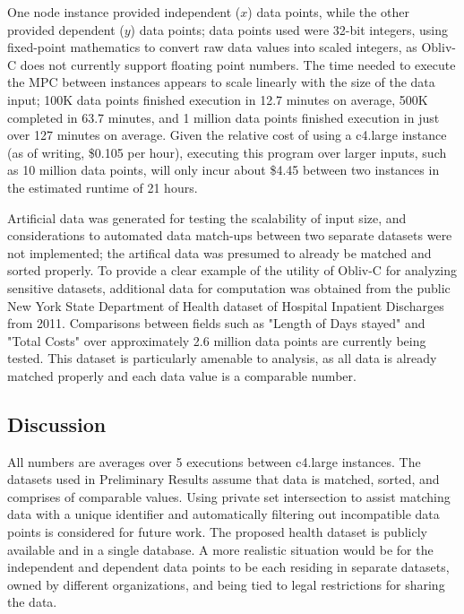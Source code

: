 \documentclass[conference]{IEEEtran}
\begin{document}
One node instance provided independent ($x$) data points, while the other provided 
dependent ($y$) data points; data points used were 32-bit integers, using fixed-point 
mathematics to convert raw data values into scaled integers, as 
Obliv-C does not currently support floating point numbers.
The time needed to execute the MPC between instances appears to scale linearly 
with the size of the data input; 100K data points finished execution in 12.7 minutes 
on average, 500K completed in 63.7 minutes, and 1 million data points finished execution 
in just over 127 minutes on average. Given the relative cost of using a c4.large instance
(as of writing, \$0.105 per hour), executing this program over larger inputs, such as
10 million data points, will only incur about \$4.45 between two instances in the 
estimated runtime of 21 hours.

Artificial data was generated for testing the scalability of input size, and
considerations to automated data match-ups between two separate datasets were not
implemented; the artifical data was presumed to already be matched and sorted properly.
To provide a clear example of the utility of Obliv-C for analyzing sensitive datasets, 
additional data for computation was obtained from the public New York State Department 
of Health dataset of Hospital Inpatient Discharges from 2011\cite{healthdata:ny}. 
Comparisons between fields such as "Length of Days stayed" and "Total Costs" 
over approximately 2.6 million data points are currently being tested.
This dataset is particularly amenable to analysis, as all data is already 
matched properly and each data value is a comparable number.

\subsection{Discussion}
All numbers are averages over 5 executions between c4.large instances. The datasets used in Preliminary Results assume that data is matched, sorted, and 
comprises of comparable values. Using private set intersection to assist matching 
data with a unique identifier and automatically filtering out incompatible 
data points is considered for future work. The proposed health dataset is
publicly available and in a single database. A more realistic situation would be 
for the independent and dependent data points to be each residing in separate 
datasets, owned by different organizations, and being tied to legal restrictions 
for sharing the data.
\end{document}
